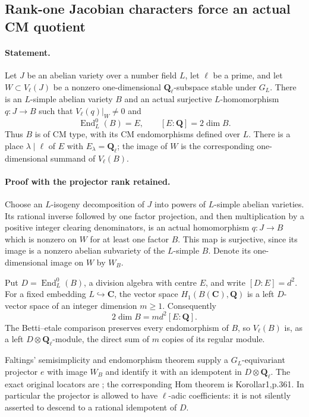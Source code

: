 \subsection*{Rank-one Jacobian characters force an actual CM quotient}

\paragraph{Statement.}
Let $J$ be an abelian variety over a number field $L$, let $\ell$ be a prime,
and let $W\subset V_\ell(J)$ be a nonzero one-dimensional
$\mathbf Q_\ell$-subspace stable under $G_L$.
There is an $L$-simple abelian variety $B$ and an actual surjective
$L$-homomorphism $q:J\to B$ such that $V_\ell(q)|_W\ne0$ and
\[
 \operatorname{End}^0_L(B)=E,\qquad [E:\mathbf Q]=2\dim B.
\]
Thus $B$ is of CM type, with its CM endomorphisms defined over $L$.
There is a place $\lambda\mid\ell$ of $E$ with $E_\lambda=\mathbf Q_\ell$;
the image of $W$ is the corresponding one-dimensional summand of
$V_\ell(B)$.

\paragraph{Proof with the projector rank retained.}
Choose an $L$-isogeny decomposition of $J$ into powers of $L$-simple
abelian varieties. Its rational inverse followed by one factor projection,
and then multiplication by a positive integer clearing denominators,
is an actual homomorphism $q:J\to B$ which is nonzero on $W$ for at least
one factor $B$. This map is surjective, since its image is a nonzero
abelian subvariety of the $L$-simple $B$. Denote its one-dimensional
image on $W$ by $W_B$.

Put $D=\operatorname{End}^0_L(B)$, a division algebra with centre $E$,
and write $[D:E]=d^2$. For a fixed embedding $L\hookrightarrow\mathbf C$,
the vector space $H_1(B(\mathbf C),\mathbf Q)$ is a left $D$-vector space
of an integer dimension $m\ge1$. Consequently
\[
 2\dim B=m d^2[E:\mathbf Q].
\]
The Betti--etale comparison preserves every endomorphism of $B$, so
$V_\ell(B)$ is, as a left $D\otimes\mathbf Q_\ell$-module, the direct
sum of $m$ copies of its regular module.

Faltings' semisimplicity and endomorphism theorem supply a $G_L$-equivariant
projector $e$ with image $W_B$ and identify it with an idempotent in
$D\otimes\mathbf Q_\ell$.
The exact original locators are \cite[\S5, S\"atze3--4,p.360]{GenFaltings1983};
the corresponding Hom theorem is Korollar1,p.361. In particular the
projector is allowed to have $\ell$-adic coefficients: it is not silently
asserted to descend to a rational idempotent of $D$.

